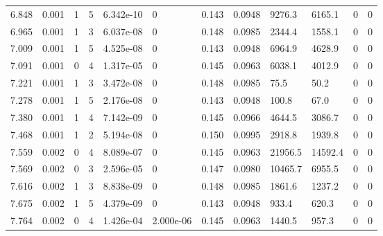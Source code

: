 \documentclass[preview]{standalone}
\begin{document}
{{{\begin{tabular}{L{1.2cm}C{1.2cm} C{0.3cm}C{0.5cm} C{1.4cm}C{1.4cm} C{1.4cm}C{1.4cm} C{1.6cm}C{1.6cm} C{1.6cm}C{1.6cm}}
  6.848  &  0.001  & 1     &  5 &  6.342e-10  & 0  &  0.143&   0.0948& 9276.3 & 6165.1   &  0 & 0  \\ 
  6.965  &  0.001  & 1     &  3 &  6.037e-08  & 0  &  0.148&   0.0985& 2344.4 & 1558.1   &  0 & 0  \\ 
  7.009  &  0.001  & 1     &  5 &  4.525e-08  & 0  &  0.143&   0.0948& 6964.9 & 4628.9   &  0 & 0  \\ 
  7.091  &  0.001  & 0     &  4 &  1.317e-05  & 0  &  0.145&   0.0963& 6038.1 & 4012.9   &  0 & 0  \\ 
  7.221  &  0.001  & 1     &  3 &  3.472e-08  & 0  &  0.148&   0.0985& 75.5 & 50.2   &  0 & 0  \\ 
  7.278  &  0.001  & 1     &  5 &  2.176e-08  & 0  &  0.143&   0.0948& 100.8 & 67.0   &  0 & 0  \\ 
  7.380  &  0.001  & 1     &  4 &  7.142e-09  & 0  &  0.145&   0.0966& 4644.5 & 3086.7   &  0 & 0  \\ 
  7.468  &  0.001  & 1     &  2 &  5.194e-08  & 0  &  0.150&   0.0995& 2918.8 & 1939.8   &  0 & 0  \\ 
  7.559  &  0.002  & 0     &  4 &  8.089e-07  & 0  &  0.145&   0.0963& 21956.5 & 14592.4   &  0 & 0  \\ 
  7.569  &  0.002  & 0     &  3 &  2.596e-05  & 0  &  0.147&   0.0980& 10465.7 & 6955.5   &  0 & 0  \\ 
  7.616  &  0.002  & 1     &  3 &  8.838e-09  & 0  &  0.148&   0.0985& 1861.6 & 1237.2   &  0 & 0  \\ 
  7.675  &  0.002  & 1     &  5 &  4.379e-09  & 0  &  0.143&   0.0948& 933.4 & 620.3   &  0 & 0  \\ 
  7.764  &  0.002  & 0     &  4 &  1.426e-04  & 2.000e-06  &  0.145&   0.0963& 1440.5 & 957.3   &  0 & 0  \\ 
\hline 
\end{tabular} 

}}}
\end{document}
